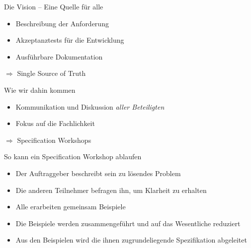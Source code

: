 \begin{frame}{Die Vision -- Eine Quelle für alle}

\begin{itemize}
	\item Beschreibung der Anforderung

	\item Akzeptanztests für die Entwicklung

	\item Ausführbare Dokumentation
\end{itemize}

\vspace{1em}

$\Rightarrow$ Single Source of Truth

\end{frame}


\begin{frame}{Wie wir dahin kommen}


\begin{itemize}
	\item Kommunikation und Diskussion \em aller \em Beteiligten 
	
	\item Fokus auf die Fachlichkeit
\end{itemize}


\vspace{1em}

$\Rightarrow$ Specification Workshops

\end{frame}



\begin{frame}{So kann ein Specification Workshop ablaufen}

\begin{itemize}
	\item Der Auftraggeber beschreibt sein zu lösendes Problem
	\item Die anderen Teilnehmer befragen ihn, um Klarheit zu erhalten
	\item Alle erarbeiten gemeinsam Beispiele
	\item Die Beispiele werden zusammengeführt und auf das Wesentliche reduziert
	\item Aus den Beispielen wird die ihnen zugrundeliegende Spezifikation abgeleitet
\end{itemize}

\end{frame}



